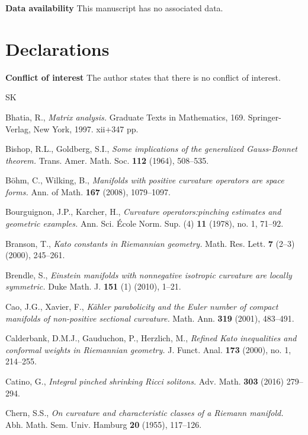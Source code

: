 \documentclass[12pt, twoside]{article}
\theoremstyle{definition}
\numberwithin{equation}{section}
\begin{document}
\noindent\textbf{Data availability} {This manuscript has no associated data.}
\section*{Declarations}
\noindent\textbf{Conflict of interest} The author states that there is no conflict of interest.


\bigskip
\footnotesize
\begin{thebibliography}{SK}
	
	
	
Bhatia, R.,
\textit{Matrix analysis.}
Graduate Texts in Mathematics, 169. Springer-Verlag, New York, 1997. xii+347 pp.

	Bishop, R.L., Goldberg, S.I.,
	\textit{ Some implications of the generalized Gauss-Bonnet theorem.}
	Trans. Amer. Math. Soc. \textbf{112} (1964), 508--535. 

B\"{o}hm, C., Wilking, B.,
\textit{Manifolds with positive curvature operators are space forms.} Ann. of Math. \textbf{167} (2008), 1079--1097.

	
Bourguignon, J.P., Karcher, H.,
\textit{Curvature operators:pinching estimates and geometric examples.} 
Ann. Sci. \'{E}cole Norm. Sup. (4) \textbf{11} (1978), no. 1, 71--92.

Branson, T.,
\textit{Kato constants in Riemannian geometry.}
Math. Res. Lett. \textbf{7} (2--3) (2000), 245--261.

Brendle, S.,
\textit{Einstein manifolds with nonnegative isotropic curvature are locally symmetric.}
Duke Math. J. \textbf{151} (1) (2010), 1--21. 

Cao, J.G., Xavier, F.,
\textit{K\"{a}hler parabolicity and the Euler number of compact manifolds of non-positive sectional curvature.}
Math. Ann. \textbf{319} (2001), 483--491.



Calderbank, D.M.J., Gauduchon, P., Herzlich, M.,
\textit{Refined Kato inequalities and conformal weights in Riemannian geometry.}
J. Funct. Anal. \textbf{173} (2000), no. 1, 214--255. 

Catino, G.,
\textit{Integral pinched shrinking Ricci solitons.}
Adv. Math. \textbf{303} (2016) 279–294. 
	
	Chern, S.S.,
	\textit{On curvature and characteristic classes of a Riemann manifold.}
	Abh. Math. Sem. Univ. Hamburg \textbf{20} (1955), 117--126. 
	

\end{thebibliography}
\end{document}
